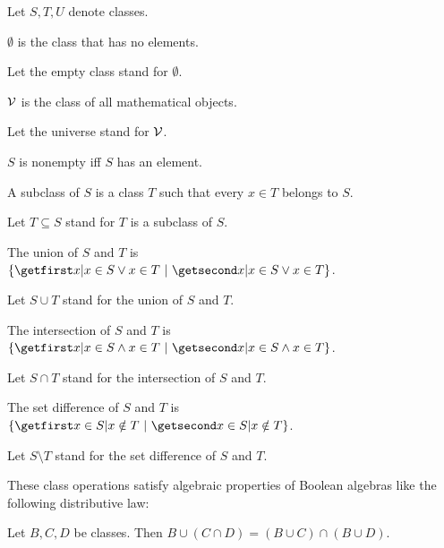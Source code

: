 \documentclass{article}
\begin{document}
\begin{forthel}
Let $S, T, U$ denote classes.

\begin{definition}
$\emptyset$ is the class that has no elements.
\end{definition}

Let the empty class stand for $\emptyset$.

\begin{definition}
${\cal V}$ is the class of all mathematical objects.
\end{definition}

Let the universe stand for ${\cal V}$.



\begin{definition}
$S$ is nonempty iff $S$ has an element.
\end{definition}

  \begin{definition}
    A subclass of $S$ is a class $T$ such that every $x \in T$ belongs to $S$.
  \end{definition}

  Let $T \subseteq S$ stand for $T$ is a subclass of $S$.

  \begin{definition}
    The union of $S$ and $T$ is $\class{x | x \in S \vee x \in T}$.
  \end{definition}

  Let $S \cup T$ stand for the union of $S$ and $T$.

  \begin{definition}
    The intersection of $S$ and $T$ is 
      $\class{x | x \in S \wedge x \in T}$.
  \end{definition}

  Let $S \cap T$ stand for the intersection of $S$ and $T$.

  \begin{definition}
    The set difference of $S$ and $T$ is $\class{x \in S | x \notin T}$.
  \end{definition}

  Let $S \setminus T$ stand for the set difference of $S$ and $T$.
\end{forthel}
These class operations satisfy algebraic properties of Boolean algebras
like the following distributive law:
\begin{forthel}

\begin{proposition}
Let $B,C,D$ be classes. Then
$B \cup (C \cap D) = (B \cup C) \cap (B \cup D)$.
\end{proposition}
\end{forthel}
\end{document}
